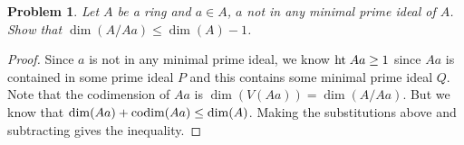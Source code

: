 \documentclass{article}
\newcommand{\Ht}{\textup{ht}\;}
\newcommand{\codim}{\textup{codim}}
\newtheorem{problem}{Problem}
\begin{document}
\begin{problem}
Let $A$ be a ring and $a \in A$, $a$ not in any minimal prime ideal of $A$. Show that $\dim(A/Aa) \leq \dim(A) - 1$.
\end{problem}
\begin{proof}
Since $a$ is not in any minimal prime ideal, we know $\Ht Aa \geq 1$ since $Aa$ is contained in some prime ideal $P$ and this contains some minimal prime ideal $Q$. Note that the codimension of $Aa$ is $\dim(V(Aa)) = \dim(A/Aa)$. But we know that $\dim(Aa) + \codim(Aa) \leq \dim(A)$. Making the substitutions above and subtracting gives the inequality.
\end{proof}
\end{document}
